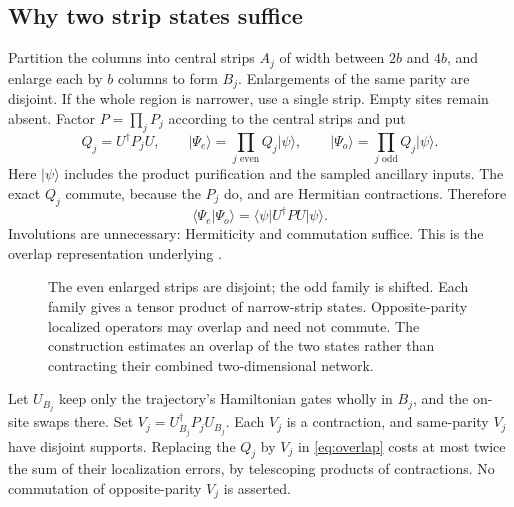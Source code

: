 \documentclass[11pt,reqno]{amsart}
\numberwithin{equation}{section}
\theoremstyle{definition}
\theoremstyle{remark}
\newcommand{\ket}[1]{\lvert#1\rangle}
\newcommand{\bra}[1]{\langle#1\rvert}
\begin{document}
\subsection{Why two strip states suffice}
Partition the columns into central strips $A_j$ of width between $2b$ and $4b$, and enlarge each by $b$ columns to form $B_j$. Enlargements of the same parity are disjoint. If the whole region is narrower, use a single strip. Empty sites remain absent. Factor $P=\prod_jP_j$ according to the central strips and put
\[
 Q_j=U^\dagger P_jU,\qquad
 \ket{\Psi_e}=\prod_{j\text{ even}}Q_j\ket\psi,\qquad
 \ket{\Psi_o}=\prod_{j\text{ odd}}Q_j\ket\psi.
\]
Here $\ket\psi$ includes the product purification and the sampled ancillary inputs. The exact $Q_j$ commute, because the $P_j$ do, and are Hermitian contractions. Therefore
\begin{equation}\label{eq:overlap}
 \bra{\Psi_e}\Psi_o\rangle
 =\bra\psi U^\dagger P U\ket\psi.
\end{equation}
Involutions are unnecessary: Hermiticity and commutation suffice. This is the overlap representation underlying \cite[Theorem~5]{BGM}.

\begin{figure}[t]
\centering
{}
\caption{The even enlarged strips are disjoint; the odd family is shifted. Each family gives a tensor product of narrow-strip states. Opposite-parity localized operators may overlap and need not commute. The construction estimates an overlap of the two states rather than contracting their combined two-dimensional network.}
\label{fig:strips}
\end{figure}

Let $U_{B_j}$ keep only the trajectory's Hamiltonian gates wholly in $B_j$, and the on-site swaps there. Set $V_j=U_{B_j}^\dagger P_jU_{B_j}$. Each $V_j$ is a contraction, and same-parity $V_j$ have disjoint supports. Replacing the $Q_j$ by $V_j$ in \eqref{eq:overlap} costs at most twice the sum of their localization errors, by telescoping products of contractions. No commutation of opposite-parity $V_j$ is asserted.
\end{document}
